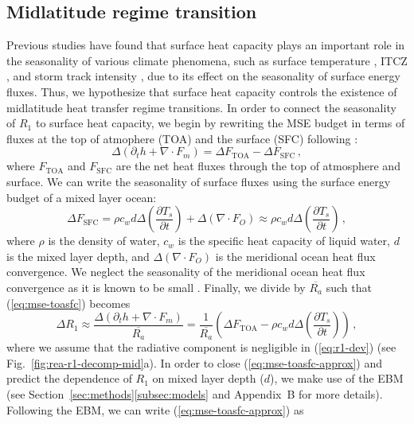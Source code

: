 \documentclass{ametsocV5}
\begin{document}
  \subsection{Midlatitude regime transition} \label{subsec:mld}
  Previous studies have found that surface heat capacity plays an important role in the seasonality of various climate phenomena, such as surface temperature \citep{donohoe2014}, ITCZ \citep{bordoni2008}, and storm track intensity \citep{barpanda2020}, due to its effect on the seasonality of surface energy fluxes. Thus, we hypothesize that surface heat capacity controls the existence of midlatitude heat transfer regime transitions. In order to connect the seasonality of $R_1$ to surface heat capacity, we begin by rewriting the MSE budget in terms of fluxes at the top of atmophere (TOA) and the surface (SFC) following \cite{barpanda2020}:
  \begin{equation}\label{eq:mse-toasfc}
    \Delta\left(\partial_t h + \nabla\cdot F_{m} \right) = \Delta F_{\mathrm{TOA}} - \Delta F_{\mathrm{SFC}} \, ,
  \end{equation}
  where \(F_{\mathrm{TOA}}\) and \(F_{\mathrm{SFC}}\) are the net heat fluxes through the top of atmosphere and surface. We can write the seasonality of surface fluxes using the surface energy budget of a mixed layer ocean:
  \begin{equation}
    \Delta F_{\mathrm{SFC}} = \rho c_{w} d \Delta\left(\frac{\partial T_{s}}{\partial t}\right) + \Delta ( \nabla\cdot F_{O}) \approx \rho c_{w} d \Delta\left(\frac{\partial T_{s}}{\partial t}\right) \, ,
  \end{equation}
  where $\rho$ is the density of water, $c_w$ is the specific heat capacity of liquid water, $d$ is the mixed layer depth, and $\Delta(\nabla\cdot F_O)$ is the meridional ocean heat flux convergence. We neglect the seasonality of the meridional ocean heat flux convergence as it is known to be small \citep{roberts2017}. Finally, we divide by $\overline{R_a}$ such that (\ref{eq:mse-toasfc}) becomes
  \begin{equation}\label{eq:mse-toasfc-approx}
    \Delta R_1 \approx \frac{\Delta\left(\partial_t h + \nabla\cdot F_{m} \right)}{\overline{R_a}} = \frac{1}{\overline{R_a}} \left(\Delta F_{\mathrm{TOA}} - \rho c_{w} d \Delta\left(\frac{\partial T_{s}}{\partial t}\right)\right) \, , 
  \end{equation}
  where we assume that the radiative component is negligible in (\ref{eq:r1-dev}) (see Fig.~\ref{fig:rea-r1-decomp-mid}a). In order to close (\ref{eq:mse-toasfc-approx}) and predict the dependence of $R_1$ on mixed layer depth ($d$), we make use of the EBM (see Section~\ref{sec:methods}\ref{subsec:models} and Appendix~B for more details). Following the EBM, we can write (\ref{eq:mse-toasfc-approx}) as
\end{document}
